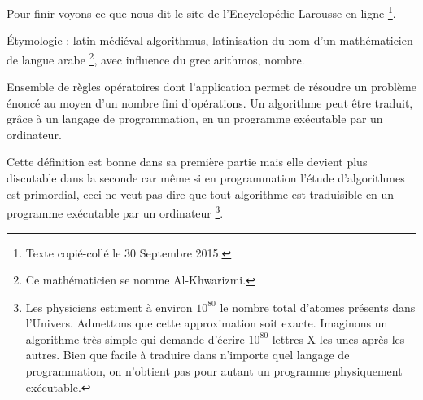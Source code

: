 Pour finir voyons ce que nous dit le site de l'Encyclopédie Larousse en ligne
\footnote{
    Texte copié-collé le 30 Septembre 2015.
}.

\vspace{-0.3em}

\begin{Quote}[author = Encyclopédie Larousse en ligne]
    Étymologie : latin médiéval algorithmus, latinisation du nom d'un mathématicien de langue arabe
    \footnote{Ce mathématicien se nomme Al-Khwarizmi.},
    avec influence du grec arithmos, nombre.

    \medskip

    Ensemble de règles opératoires dont l'application permet de résoudre un problème énoncé au moyen d'un nombre fini d'opérations. Un algorithme peut être traduit, grâce à un langage de programmation, en un programme exécutable par un ordinateur.
\end{Quote}

\vspace{-0.3em}

Cette définition est bonne dans sa première partie mais elle devient plus discutable dans la seconde car même si en programmation l'étude d'algorithmes est primordial, ceci ne veut pas dire que tout algorithme est traduisible en un programme exécutable par un ordinateur
\footnote{
    Les physiciens estiment à environ $10^{80}$ le nombre total d'atomes présents dans l'Univers. Admettons que cette approximation soit exacte. Imaginons un algorithme très simple qui demande d'écrire $10^{80}$ lettres X les unes après les autres. Bien que facile à traduire dans n'importe quel langage de programmation, on n'obtient pas pour autant un programme physiquement exécutable.
}.
